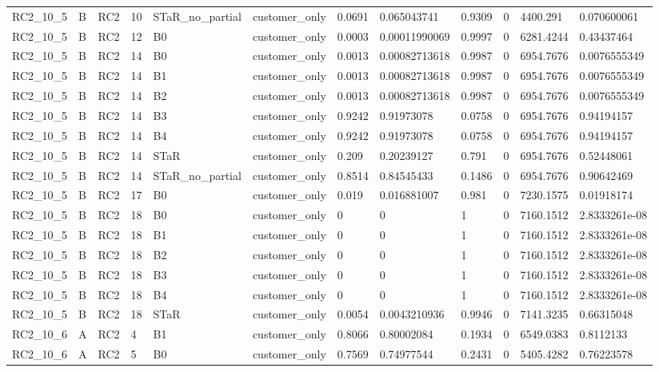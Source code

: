 \begin{longtable}{llllllllllll}
RC2\_10\_5 & B & RC2 & 10 & STaR\_no\_partial & customer\_only & 0.0691 & 0.065043741 & 0.9309 & 0 & 4400.291 & 0.070600061 \\
RC2\_10\_5 & B & RC2 & 12 & B0 & customer\_only & 0.0003 & 0.00011990069 & 0.9997 & 0 & 6281.4244 & 0.43437464 \\
RC2\_10\_5 & B & RC2 & 14 & B0 & customer\_only & 0.0013 & 0.00082713618 & 0.9987 & 0 & 6954.7676 & 0.0076555349 \\
RC2\_10\_5 & B & RC2 & 14 & B1 & customer\_only & 0.0013 & 0.00082713618 & 0.9987 & 0 & 6954.7676 & 0.0076555349 \\
RC2\_10\_5 & B & RC2 & 14 & B2 & customer\_only & 0.0013 & 0.00082713618 & 0.9987 & 0 & 6954.7676 & 0.0076555349 \\
RC2\_10\_5 & B & RC2 & 14 & B3 & customer\_only & 0.9242 & 0.91973078 & 0.0758 & 0 & 6954.7676 & 0.94194157 \\
RC2\_10\_5 & B & RC2 & 14 & B4 & customer\_only & 0.9242 & 0.91973078 & 0.0758 & 0 & 6954.7676 & 0.94194157 \\
RC2\_10\_5 & B & RC2 & 14 & STaR & customer\_only & 0.209 & 0.20239127 & 0.791 & 0 & 6954.7676 & 0.52448061 \\
RC2\_10\_5 & B & RC2 & 14 & STaR\_no\_partial & customer\_only & 0.8514 & 0.84545433 & 0.1486 & 0 & 6954.7676 & 0.90642469 \\
RC2\_10\_5 & B & RC2 & 17 & B0 & customer\_only & 0.019 & 0.016881007 & 0.981 & 0 & 7230.1575 & 0.01918174 \\
RC2\_10\_5 & B & RC2 & 18 & B0 & customer\_only & 0 & 0 & 1 & 0 & 7160.1512 & 2.8333261e-08 \\
RC2\_10\_5 & B & RC2 & 18 & B1 & customer\_only & 0 & 0 & 1 & 0 & 7160.1512 & 2.8333261e-08 \\
RC2\_10\_5 & B & RC2 & 18 & B2 & customer\_only & 0 & 0 & 1 & 0 & 7160.1512 & 2.8333261e-08 \\
RC2\_10\_5 & B & RC2 & 18 & B3 & customer\_only & 0 & 0 & 1 & 0 & 7160.1512 & 2.8333261e-08 \\
RC2\_10\_5 & B & RC2 & 18 & B4 & customer\_only & 0 & 0 & 1 & 0 & 7160.1512 & 2.8333261e-08 \\
RC2\_10\_5 & B & RC2 & 18 & STaR & customer\_only & 0.0054 & 0.0043210936 & 0.9946 & 0 & 7141.3235 & 0.66315048 \\
RC2\_10\_6 & A & RC2 & 4 & B1 & customer\_only & 0.8066 & 0.80002084 & 0.1934 & 0 & 6549.0383 & 0.8112133 \\
RC2\_10\_6 & A & RC2 & 5 & B0 & customer\_only & 0.7569 & 0.74977544 & 0.2431 & 0 & 5405.4282 & 0.76223578 \\

\end{longtable}
